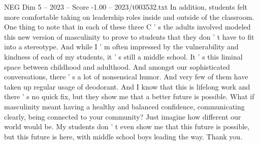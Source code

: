 \begin{textsample}{NEG Dim 5 – 2023 – Score -1.00 – 2023/t003532.txt}
In addition, students felt more comfortable taking on leadership roles inside and outside of the classroom.
One thing to note that in each of these three C ' s the adults involved modeled this new version of masculinity to prove to students that they don ' t have to fit into a stereotype.
And while I ' m often impressed by the vulnerability and kindness of each of my students, it ' s still a middle school.
It ' s this liminal space between childhood and adulthood.
And amongst our sophisticated conversations, there ' s a lot of nonsensical humor.
And very few of them have taken up regular usage of deodorant.
And I know that this is lifelong work and there ' s no quick fix, but they show me that a better future is possible.
What if masculinity meant having a healthy and balanced confidence, communicating clearly, being connected to your community?
Just imagine how different our world would be.
My students don ' t even show me that this future is possible, but this future is here, with middle school boys leading the way.
Thank you.

\end{textsample}
